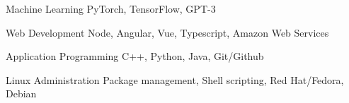 
\begin{cvskills}
  \cvskill
  {Machine Learning}
  {PyTorch, TensorFlow, GPT-3}
  
  \cvskill
  	{Web Development}
  	{Node, Angular, Vue, Typescript, Amazon Web Services}
  
  \cvskill
  	{Application Programming}
  	{C++, Python, Java, Git/Github}
  	
  \cvskill
  	{Linux Administration}
  	{Package management, Shell scripting, Red Hat/Fedora, Debian}
\end{cvskills}
